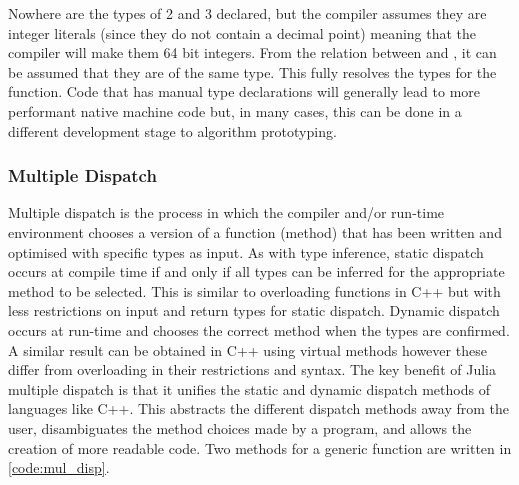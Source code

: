 \begin{center}
\end{center}

Nowhere are the types of 2 and 3 declared, but the compiler assumes they are integer literals (since they do not contain a decimal point) meaning that the compiler will make them 64 bit integers. From the relation between  and , it can be assumed that they are of the same type. This fully resolves the types for the function. Code that has manual type declarations will generally lead to more performant native machine code but, in many cases, this can be done in a different development stage to algorithm prototyping.


\pagebreak

\subsubsection{Multiple Dispatch}
Multiple dispatch is the process in which the compiler and/or run-time environment chooses a version of a function (method) that has been written and optimised with specific types as input. As with type inference, static dispatch occurs at compile time if and only if all types can be inferred for the appropriate method to be selected. This is similar to overloading functions in C++ but with less restrictions on input and return types for static dispatch. Dynamic dispatch occurs at run-time and chooses the correct method when the types are confirmed. A similar result can be obtained in C++ using virtual methods however these differ from overloading in their restrictions and syntax. The key benefit of Julia multiple dispatch is that it unifies the static and dynamic dispatch methods of languages like C++. This abstracts the different dispatch methods away from the user, disambiguates the method choices made by a program, and allows the creation of more readable code. Two methods for a generic function are written in \ref{code:mul_disp}. 

